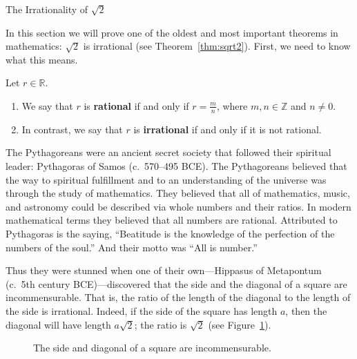 \begin{section}{The Irrationality of $\sqrt{2}$}\label{sec:irrationality of root 2}

In this section we will prove one of the oldest and most important theorems in mathematics: $\sqrt{2}$ is irrational (see Theorem~\ref{thm:sqrt2}). First, we need to know what this means.

\begin{definition}
Let $r\in\mathbb{R}$.
\begin{enumerate}[label=\textrm{(\alph*)}]
\item We say that $r$ is \textbf{rational} if and only if $r=\frac{m}{n}$, where $m,n\in\mathbb{Z}$ and $n\neq 0$.
\item In contrast, we say that $r$ is \textbf{irrational} if and only if it is not rational.
\end{enumerate} 
\end{definition}

The Pythagoreans were an ancient secret society that followed their spiritual leader: Pythagoras of Samos (c.\ 570--495 BCE). The Pythagoreans believed that the way to spiritual fulfillment and to an understanding of the universe was through the study of mathematics. They believed that all of mathematics, music, and astronomy could be described via whole numbers and their ratios. In modern mathematical terms they believed that all numbers are rational. Attributed to Pythagoras is the saying, ``Beatitude is the knowledge of the perfection of the numbers of the soul.'' And their motto was ``All is number.''

Thus they were stunned when one of their own---Hippasus of Metapontum (c.~5th century BCE)---discovered that the side and the diagonal of a square are incommensurable. That is, the ratio of the length of the diagonal to the length of the side is irrational. Indeed, if the side of the square has length $a$, then the diagonal will have length $a\sqrt{2}$; the ratio is $\sqrt{2}$ (see Figure~\ref{fig:square}).

\begin{figure}[h!]
\centering
{}
\caption{The side and diagonal of a square are incommensurable.}\label{fig:square}
\end{figure}


\end{section}
